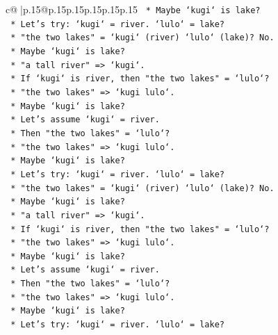 \documentclass{article}
\begin{document}
{\begin{supertabular}{c@{$\;$}|p{.15\linewidth}@{}p{.15\linewidth}p{.15\linewidth}p{.15\linewidth}p{.15\linewidth}p{.15\linewidth}}
{{{\texttt{                    *   Maybe `kugi` is lake?} \\
\texttt{                    *   Let's try: `kugi` = river. `lulo` = lake?} \\
\texttt{                    *   "the two lakes" = `kugi` (river) `lulo` (lake)? No.} \\
\texttt{                    *   Maybe `kugi` is lake?} \\
\texttt{                    *   "a tall river" => `kugi`.} \\
\texttt{                    *   If `kugi` is river, then "the two lakes" = `lulo`?} \\
\texttt{                    *   "the two lakes" => `kugi lulo`.} \\
\texttt{                    *   Maybe `kugi` is lake?} \\
\texttt{                    *   Let's assume `kugi` = river.} \\
\texttt{                    *   Then "the two lakes" = `lulo`?} \\
\texttt{                    *   "the two lakes" => `kugi lulo`.} \\
\texttt{                    *   Maybe `kugi` is lake?} \\
\texttt{                    *   Let's try: `kugi` = river. `lulo` = lake?} \\
\texttt{                    *   "the two lakes" = `kugi` (river) `lulo` (lake)? No.} \\
\texttt{                    *   Maybe `kugi` is lake?} \\
\texttt{                    *   "a tall river" => `kugi`.} \\
\texttt{                    *   If `kugi` is river, then "the two lakes" = `lulo`?} \\
\texttt{                    *   "the two lakes" => `kugi lulo`.} \\
\texttt{                    *   Maybe `kugi` is lake?} \\
\texttt{                    *   Let's assume `kugi` = river.} \\
\texttt{                    *   Then "the two lakes" = `lulo`?} \\
\texttt{                    *   "the two lakes" => `kugi lulo`.} \\
\texttt{                    *   Maybe `kugi` is lake?} \\
\texttt{                    *   Let's try: `kugi` = river. `lulo` = lake?} \\
}}}
\end{supertabular}}
\end{document}
